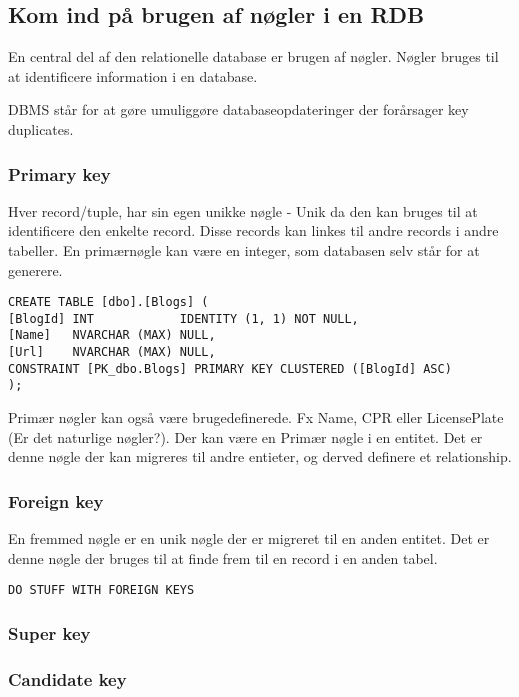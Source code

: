 \subsection{Kom ind på brugen af nøgler i en RDB}\label{sec:keys}
En central del af den relationelle database er brugen af nøgler. Nøgler bruges til at identificere information i en database.

DBMS står for at gøre umuliggøre databaseopdateringer der forårsager key duplicates.

\subsubsection{Primary key}
Hver record/tuple, har sin egen unikke nøgle - Unik da den kan bruges til at identificere den enkelte record. Disse records kan linkes til andre records i andre tabeller. En primærnøgle kan være en integer, som databasen selv står for at generere.

\begin{lstlisting}
CREATE TABLE [dbo].[Blogs] (
[BlogId] INT            IDENTITY (1, 1) NOT NULL,
[Name]   NVARCHAR (MAX) NULL,
[Url]    NVARCHAR (MAX) NULL,
CONSTRAINT [PK_dbo.Blogs] PRIMARY KEY CLUSTERED ([BlogId] ASC)
);
\end{lstlisting}

Primær nøgler kan også være brugedefinerede. Fx Name, CPR eller  LicensePlate (Er det naturlige nøgler?). Der kan være en Primær nøgle i en entitet. Det er denne nøgle der kan migreres til andre entieter, og derved definere et relationship.
\subsubsection{Foreign key}
En fremmed nøgle er en unik nøgle der er migreret til en anden entitet.
Det er denne nøgle der bruges til at finde frem til en record i en anden tabel.

\begin{lstlisting}
DO STUFF WITH FOREIGN KEYS
\end{lstlisting}


\subsubsection{Super key}

\subsubsection{Candidate key}